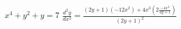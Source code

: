 {$x^4+y^2+y=7$
}
{$\frac{d^2y}{dx^2} = \frac{(2y+1)(-12x^2) + 4x^3\left(2\frac{-4x^3}{2y+1}\right)}{(2y+1)^2}$
}
